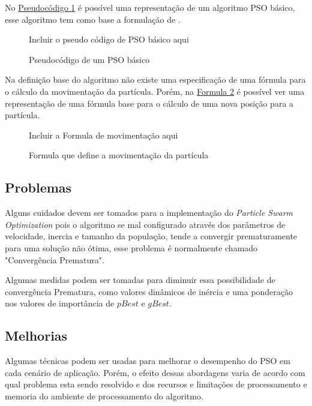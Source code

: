         No \hyperref[alg:pso-base]{Pseudocódigo \ref{alg:pso-base}} 
        é possível uma representação de um algoritmo PSO básico, esse algoritmo tem como base a formulação de \cite{martinez2009}.
        
        \begin{figure}[h]
            \centering
            \small{Incluir o pseudo código de PSO básico aqui}
            \caption{Pseudocódigo de um PSO básico}
            \label{alg:pso-base}
        \end{figure}

        Na definição base do algoritmo não existe uma especificação de uma fórmula para o cálculo da movimentação da partícula. Porém, na 
        \hyperref[fig:formula-movimentacao]{Formula \ref{fig:formula-movimentacao}} 
        é possível ver uma representação de uma fórmula base para o cálculo de uma nova posição para a partícula.
                
        \begin{figure}[h]
            \centering
            \small{Incluir a Formula de movimentação aqui}
            \caption{Formula que define a movimentação da partícula}
            \label{fig:formula-movimentacao}
        \end{figure}

    

    \subsection{Problemas}
        Alguns cuidados devem ser tomados para a implementação do \textit{Particle Swarm Optimization} pois o algoritmo se mal configurado através dos parâmetros de velocidade, inercia e tamanho da população, tende a convergir prematuramente para uma solução não ótima, esse problema é normalmente chamado "Convergência Prematura".\hfill\vspace{\onelineskip}
        
        Algumas medidas podem ser tomadas para diminuir essa possibilidade de convergência Prematura, como valores dinâmicos de inércia e uma ponderação nos valores de importância de $pBest$ e $gBest$.


    \subsection{Melhorias}
            Algumas técnicas podem ser usadas para melhorar o desempenho do PSO em cada cenário de aplicação. Porém, o efeito dessas abordagens varia de acordo com qual problema esta sendo resolvido e dos recursos e limitações de processamento e memoria do ambiente de processamento do algoritmo.

